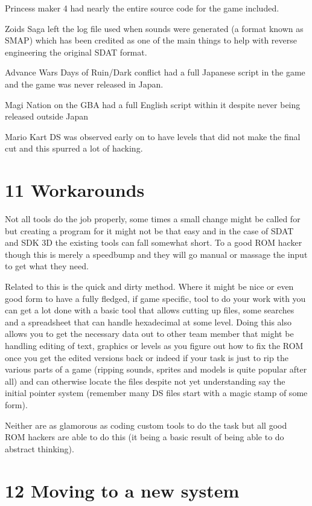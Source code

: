 \documentclass[
]{book}
\begin{document}
Princess maker 4 had nearly the entire source code for the game included.

Zoids Saga left the log file used when sounds were generated (a format known as SMAP) which has been credited as one of the main things to help with reverse engineering the original SDAT format.

Advance Wars Days of Ruin/Dark conflict had a full Japanese script in the game and the game was never released in Japan.

Magi Nation on the GBA had a full English script within it despite never being released outside Japan

Mario Kart DS was observed early on to have levels that did not make the final cut and this spurred a lot of hacking.

\hypertarget{workarounds}{%
\chapter{11 Workarounds}\label{workarounds}}

Not all tools do the job properly, some times a small change might be called for but creating a program for it might not be that easy and in the case of SDAT and SDK 3D the existing tools can fall somewhat short. To a good ROM hacker though this is merely a speedbump and they will go manual or massage the input to get what they need.

Related to this is the quick and dirty method. Where it might be nice or even good form to have a fully fledged, if game specific, tool to do your work with you can get a lot done with a basic tool that allows cutting up files, some searches and a spreadsheet that can handle hexadecimal at some level. Doing this also allows you to get the necessary data out to other team member that might be handling editing of text, graphics or levels as you figure out how to fix the ROM once you get the edited versions back or indeed if your task is just to rip the various parts of a game (ripping sounds, sprites and models is quite popular after all) and can otherwise locate the files despite not yet understanding say the initial pointer system (remember many DS files start with a magic stamp of some form).

Neither are as glamorous as coding custom tools to do the task but all good ROM hackers are able to do this (it being a basic result of being able to do abstract thinking).

\hypertarget{moving-to-a-new-system}{%
\chapter{12 Moving to a new system}\label{moving-to-a-new-system}}
\end{document}
